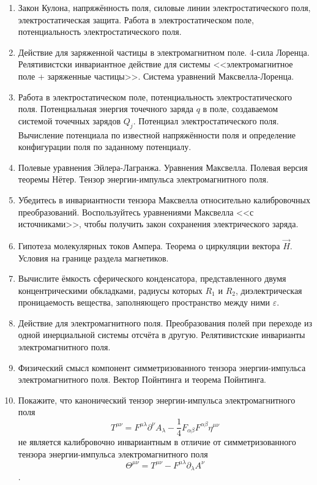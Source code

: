 \documentclass[12pt]{article}
\newcommand{\eL}[1]{\label{Э-#1}}
\def\twodigits#1{%
\ifnum#1<10 0\fi 
\number#1}
\begin{document}
\begin{enumerate}[label={\textbf{Э-\protect\twodigits{\theenumi}}}]
\item\eL{9}
Закон Кулона, напряжённость поля, силовые линии электростатического поля, электростатическая защита. Работа в электростатическом поле, потенциальность электростатического поля.

\item\eL{10}
Действие для заряженной частицы в электромагнитном поле. 4-сила Лоренца. Релятивистски инвариантное действие для системы <<электромагнитное поле + заряженные частицы>>. Система уравнений Максвелла-Лоренца.

\item\eL{11}
Работа в электростатическом поле, потенциальность электростатического поля. Потенциальная энергия точечного заряда $q$ в поле, создаваемом системой точечных зарядов $Q_j$. Потенциал электростатического поля. Вычисление потенциала по известной напряжённости поля и определение конфигурации поля по заданному потенциалу.

\item\eL{12}
Полевые уравнения Эйлера-Лагранжа. Уравнения Максвелла. Полевая версия теоремы Нётер. Тензор энергии-импульса электромагнитного поля.

\item\eL{13}
Убедитесь в инвариантности тензора Максвелла относительно калибровочных преобразований. Воспользуйтесь уравнениями Максвелла <<с источниками>>, чтобы получить закон сохранения электрического заряда.

\item\eL{14}
Гипотеза молекулярных токов Ампера. Теорема о циркуляции вектора $\vec{H}$. Условия на границе раздела магнетиков.

\item\eL{15}
Вычислите ёмкость сферического конденсатора, представленного двумя концентрическими обкладками, радиусы которых $R_1$ и $R_2$, диэлектрическая проницаемость вещества, заполняющего пространство между ними $\varepsilon$.

\item\eL{16}
Действие для электромагнитного поля. Преобразования полей при переходе из одной инерциальной системы отсчёта в другую. Релятивистские инварианты электромагнитного поля.

\item\eL{17}
Физический смысл компонент симметризованного тензора энергии-импульса электромагнитного поля. Вектор Пойнтинга и теорема Пойнтинга.

\item\eL{18}
Покажите, что канонический тензор энергии-импульса электромагнитного
поля 
$$
T^{\mu\nu}=F^{\mu\lambda}\partial^\nu A_\lambda-\frac{1}{4}F_{\alpha\beta}F^{\alpha\beta}\eta^{\mu\nu}
$$
не является калибровочно инвариантным в отличие от симметризованного тензора энергии-импульса электромагнитного поля 
$$
\Theta^{\mu\nu} = T^{\mu\nu}-F^{\mu\lambda}\partial_{\lambda}A^{\nu}
$$.


\end{enumerate}
\end{document}
